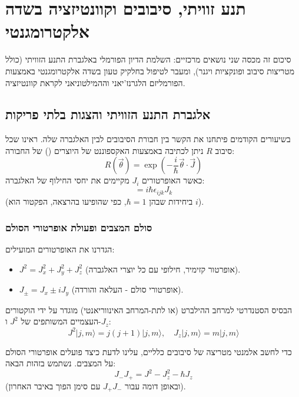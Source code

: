\section{תנע זוויתי, סיבובים וקוונטיזציה בשדה אלקטרומגנטי}

סיכום זה מכסה שני נושאים מרכזיים: השלמת הדיון הפורמלי באלגברת התנע הזוויתי (כולל מטריצות סיבוב ופונקציות ויגנר), ומעבר לטיפול בחלקיק טעון בשדה אלקטרומגנטי באמצעות הפורמליזם הלגרנז'יאני וההמילטוניאני לקראת קוונטיזציה.

\subsection{אלגברת התנע הזוויתי והצגות בלתי פריקות}

בשיעורים הקודמים פיתחנו את הקשר בין חבורת הסיבובים  לבין האלגברה שלה. ראינו שכל סיבוב $R$ ניתן לכתיבה באמצעות האקספוננט של היוצרים () של החבורה:
\begin{equation}
    R(\vec{\theta}) = \exp\left(-\frac{i}{\hbar} \vec{\theta} \cdot \vec{J}\right)
\end{equation}
כאשר האופרטורים $J_i$ מקיימים את יחסי החילוף של האלגברה:
\begin{equation}
    [J_i, J_j] = i\hbar \epsilon_{ijk} J_k
\end{equation}
(ביחידות שבהן $\hbar=1$, כפי שהופיעו בהרצאה, הפקטור הוא $i$).

\subsubsection{סולם המצבים ופעולת אופרטורי הסולם}
הגדרנו את האופרטורים המועילים:
\begin{itemize}
    \item $J^2 = J_x^2 + J_y^2 + J_z^2$ (אופרטור קזימיר, חילופי עם כל יוצרי האלגברה).
    \item $J_\pm = J_x \pm i J_y$ (אופרטורי סולם - העלאה והורדה).
\end{itemize}

הבסיס הסטנדרטי למרחב ההילברט (או לתת-המרחב האינווריאנטי) מוגדר על ידי הוקטורים העצמיים המשותפים של $J^2$ ו-$J_z$:
\begin{equation}
    J^2 |j,m\rangle = j(j+1) |j,m\rangle, \quad J_z |j,m\rangle = m |j,m\rangle
\end{equation}

כדי לחשב אלמנטי מטריצה של סיבובים כלליים, עלינו לדעת כיצד פועלים אופרטורי הסולם על המצבים. נשתמש בזהות הבאה:
\begin{equation}
    J_- J_+ = J^2 - J_z^2 - \hbar J_z
\end{equation}
(ובאופן דומה עבור $J_+ J_-$ עם סימן הפוך באיבר האחרון).

